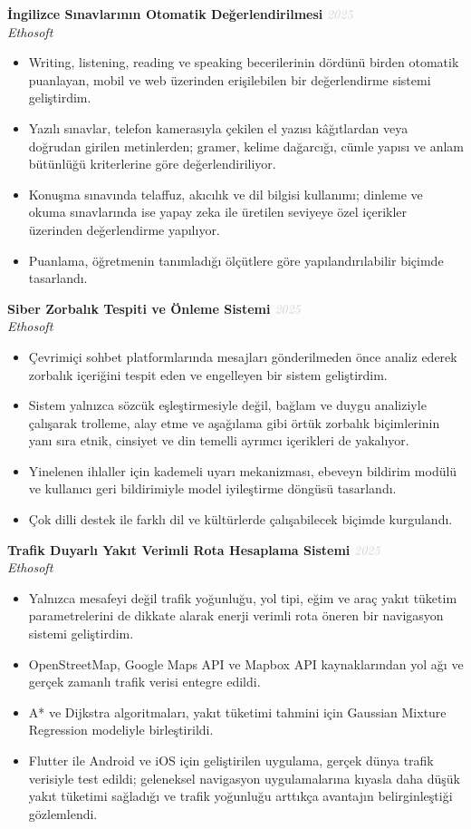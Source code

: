\documentclass[11pt,a4paper]{article}
\newcommand{\blueitem}[1]{\textcolor{subtitleblue}{\textbf{#1}}}
\newcommand{\daterange}[1]{\hfill \textcolor{lightgray}{\textit{#1}}}
\begin{document}
\blueitem{İngilizce Sınavlarının Otomatik Değerlendirilmesi} \daterange{2025}\\
\textit{Ethosoft}
\begin{itemize}
    \item Writing, listening, reading ve speaking becerilerinin dördünü birden otomatik puanlayan, mobil ve web üzerinden erişilebilen bir değerlendirme sistemi geliştirdim.
    \item Yazılı sınavlar, telefon kamerasıyla çekilen el yazısı kâğıtlardan veya doğrudan girilen metinlerden; gramer, kelime dağarcığı, cümle yapısı ve anlam bütünlüğü kriterlerine göre değerlendiriliyor.
    \item Konuşma sınavında telaffuz, akıcılık ve dil bilgisi kullanımı; dinleme ve okuma sınavlarında ise yapay zeka ile üretilen seviyeye özel içerikler üzerinden değerlendirme yapılıyor.
    \item Puanlama, öğretmenin tanımladığı ölçütlere göre yapılandırılabilir biçimde tasarlandı.
\end{itemize}

\blueitem{Siber Zorbalık Tespiti ve Önleme Sistemi} \daterange{2025}\\
\textit{Ethosoft}
\begin{itemize}
    \item Çevrimiçi sohbet platformlarında mesajları gönderilmeden önce analiz ederek zorbalık içeriğini tespit eden ve engelleyen bir sistem geliştirdim.
    \item Sistem yalnızca sözcük eşleştirmesiyle değil, bağlam ve duygu analiziyle çalışarak trolleme, alay etme ve aşağılama gibi örtük zorbalık biçimlerinin yanı sıra etnik, cinsiyet ve din temelli ayrımcı içerikleri de yakalıyor.
    \item Yinelenen ihlaller için kademeli uyarı mekanizması, ebeveyn bildirim modülü ve kullanıcı geri bildirimiyle model iyileştirme döngüsü tasarlandı.
    \item Çok dilli destek ile farklı dil ve kültürlerde çalışabilecek biçimde kurgulandı.
\end{itemize}

\blueitem{Trafik Duyarlı Yakıt Verimli Rota Hesaplama Sistemi} \daterange{2025}\\
\textit{Ethosoft}
\begin{itemize}
    \item Yalnızca mesafeyi değil trafik yoğunluğu, yol tipi, eğim ve araç yakıt tüketim parametrelerini de dikkate alarak enerji verimli rota öneren bir navigasyon sistemi geliştirdim.
    \item OpenStreetMap, Google Maps API ve Mapbox API kaynaklarından yol ağı ve gerçek zamanlı trafik verisi entegre edildi.
    \item A* ve Dijkstra algoritmaları, yakıt tüketimi tahmini için Gaussian Mixture Regression modeliyle birleştirildi.
    \item Flutter ile Android ve iOS için geliştirilen uygulama, gerçek dünya trafik verisiyle test edildi; geleneksel navigasyon uygulamalarına kıyasla daha düşük yakıt tüketimi sağladığı ve trafik yoğunluğu arttıkça avantajın belirginleştiği gözlemlendi.
\end{itemize}
\end{document}
